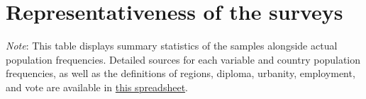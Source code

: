 \clearpage
\section{Representativeness of the surveys}\label{app:representativeness}


\begin{table}[h!]
    \cprotect\caption[Sample representativeness of \textit{US1}, \textit{US2}, \textit{Eu}]{Sample representativeness of the Western surveys. %
    } \label{tab:representativeness_waves}
    \makebox[\textwidth][c]{
        \resizebox*{!}{.80\textheight}{%
        
        }
    }
    {\footnotesize \textit{Note}: This table displays summary statistics of the samples alongside actual population frequencies. %
    Detailed sources for each variable and country population frequencies, as well as the definitions of regions, diploma, urbanity, employment, and vote are available in \href{https://github.com/bixiou/international_attitudes_toward_global_policies/raw/main/questionnaire/specificities.xlsx}{this spreadsheet}. %
    } %
\end{table}

